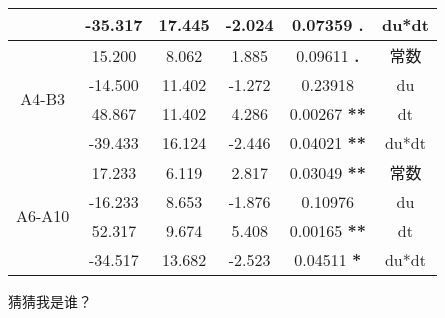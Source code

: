 \documentclass{article}
\begin{document}
\begin{table}
\begin{tabular}{c|c|c|c|c|c}
                                & -35.317 & 17.445 & -2.024 & 0.07359 \textbf{.}         & du*dt \\
        \hline
        \multirow{4}{*}{A4-B3} & 15.200  & 8.062  & 1.885  & 0.09611 \textbf{.}         & 常数  \\
                                & -14.500 & 11.402 & -1.272 & 0.23918           & du    \\
                                & 48.867  & 11.402 & 4.286  & 0.00267 \textbf{**}        & dt    \\
                                & -39.433 & 16.124 & -2.446 & 0.04021 \textbf{**}         & du*dt \\
        \hline
        \multirow{4}{*}{A6-A10} & 17.233  & 6.119  & 2.817  & 0.03049 \textbf{**}         & 常数  \\
                                & -16.233 & 8.653  & -1.876 & 0.10976           & du    \\
                                & 52.317  & 9.674  & 5.408  & 0.00165 \textbf{**}        & dt    \\
                                & -34.517 & 13.682 & -2.523 & 0.04511 \textbf{*}         & du*dt \\
        \hline
    \end{tabular}
\end{table}
猜猜我是谁？
\newpage
\end{document}
